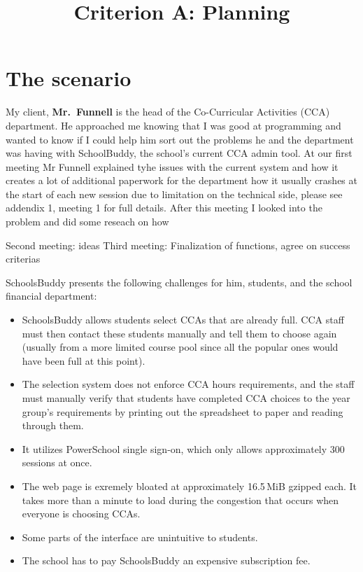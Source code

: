 

\title{Criterion A: Planning}


\maketitle

\section{The scenario}


My client, \textbf{Mr.~Funnell} is the head of the Co-Curricular Activities
(CCA) department. He approached me knowing that I was good at programming and
wanted to know if I could help him sort out the problems he and the department
was having with SchoolBuddy, the school's current CCA admin tool.  At our first
meeting Mr Funnell explained tyhe issues with the current system and how it
creates a lot of additional paperwork for the department how it usually crashes
at the start of each new session due to limitation on the technical side,
please see addendix 1, meeting 1 for full details.  After this meeting I looked
into the problem and did some reseach on how 

Second meeting: ideas
Third meeting: Finalization of functions, agree on success criterias

SchoolsBuddy
presents the following challenges for him, students, and the school financial
department:

\begin{itemize}
	\item SchoolsBuddy allows students select CCAs that are already full.
		CCA staff must then contact these students manually and tell
		them to choose again (usually from a more limited course pool
		since all the popular ones would have been full at this point).
	\item The selection system does not enforce CCA hours requirements, and
		the staff must manually verify that students have completed CCA
		choices to the year group's requirements by printing out the
		spreadsheet to paper and reading through them.
	\item It utilizes PowerSchool single sign-on, which only allows
		approximately 300 sessions at once.
	\item The web page is exremely bloated at approximately 16.5\,MiB
		gzipped each. It takes more than a minute to load during the
		congestion that occurs when everyone is choosing CCAs.
	\item Some parts of the interface are unintuitive to students.
	\item The school has to pay SchoolsBuddy an expensive subscription fee.
\end{itemize}

